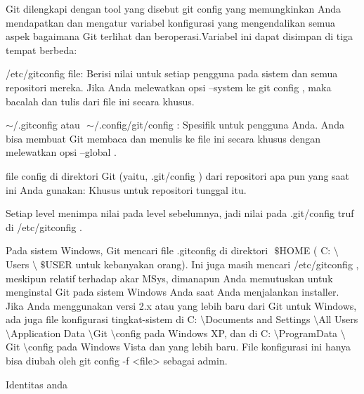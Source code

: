 \noindent 
Git dilengkapi dengan tool yang disebut $  $git config $  $yang memungkinkan Anda mendapatkan dan mengatur variabel konfigurasi yang mengendalikan semua aspek bagaimana Git terlihat dan beroperasi.Variabel ini dapat disimpan di tiga tempat berbeda: \par
\vspace{12pt}
\noindent 
/etc/gitconfig $  $file: Berisi nilai untuk setiap pengguna pada sistem dan semua repositori mereka. $  $Jika Anda melewatkan opsi $  $--system $  $ke $  $git config $  $, maka bacalah dan tulis dari file ini secara khusus. \par
\vspace{12pt}
\noindent 
 $  \sim  $/.gitconfig $  $atau $  $ $  \sim  $/.config/git/config $  $: Spesifik untuk pengguna Anda. $  $Anda bisa membuat Git membaca dan menulis ke file ini secara khusus dengan melewatkan opsi $  $--global $  $. \par
\vspace{12pt}
\noindent 
file $  $config $  $di direktori Git (yaitu, $  $.git/config $  $) dari repositori apa pun yang saat ini Anda gunakan: Khusus untuk repositori tunggal itu. \par
\vspace{12pt}
\noindent 
Setiap level menimpa nilai pada level sebelumnya, jadi nilai pada $  $.git/config $  $truf di $  $/etc/gitconfig $  $. \par
\vspace{12pt}
\noindent 
Pada sistem Windows, Git mencari file $  $.gitconfig $  $di direktori $  $ $  \$  $HOME $  $( $  $C: $  \setminus  $Users $  \setminus  $ $  \$  $USER $  $untuk kebanyakan orang). $  $Ini juga masih mencari $  $/etc/gitconfig $  $, meskipun relatif terhadap akar MSys, dimanapun Anda memutuskan untuk menginstal Git pada sistem Windows Anda saat Anda menjalankan installer. $  $Jika Anda menggunakan versi 2.x atau yang lebih baru dari Git untuk Windows, ada juga file konfigurasi tingkat-sistem di $  $C: $  \setminus  $Documents and Settings $  \setminus  $All Users $  \setminus  $Application Data $  \setminus  $Git $  \setminus  $config $  $pada Windows XP, dan di $  $C: $  \setminus  $ProgramData $  \setminus  $Git $  \setminus  $config $  $pada Windows Vista dan yang lebih baru. $  $File konfigurasi ini hanya bisa diubah oleh $  $git config -f <file> $  $sebagai admin. \par
\vspace{12pt}
\noindent 
Identitas anda \par
\vspace{12pt}
